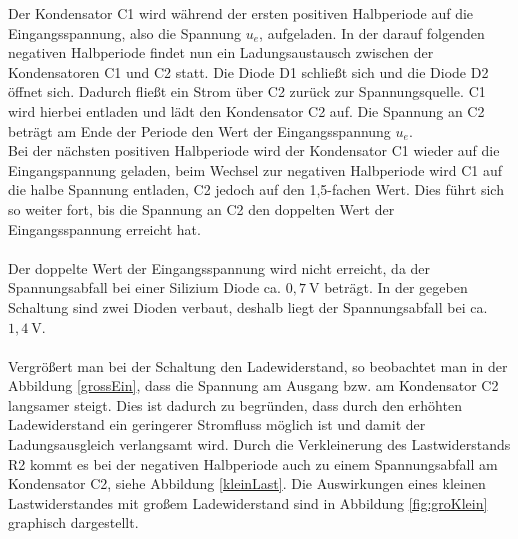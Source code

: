 Der Kondensator C1 wird während der ersten positiven Halbperiode auf die Eingangsspannung, also die Spannung $u_{e}$, aufgeladen. In der darauf folgenden negativen Halbperiode findet nun ein Ladungsaustausch zwischen der Kondensatoren C1 und C2 statt. Die Diode D1 schließt sich und die Diode D2 öffnet sich. Dadurch fließt ein Strom über C2 zurück zur Spannungsquelle. C1 wird hierbei entladen und lädt den Kondensator C2 auf. Die Spannung an C2 beträgt am Ende der Periode den Wert der Eingangsspannung $u_{e}$. \\
Bei der nächsten positiven Halbperiode wird der Kondensator C1 wieder auf die Eingangspannung geladen, beim Wechsel zur negativen Halbperiode wird C1 auf die halbe Spannung entladen, C2 jedoch auf den 1,5-fachen Wert. Dies führt sich so weiter fort, bis die Spannung an C2 den doppelten Wert der Eingangsspannung erreicht hat.
\\ \\
Der doppelte Wert der Eingangsspannung wird nicht erreicht, da der Spannungsabfall bei einer Silizium Diode ca. $0,7\:$\si{\volt} beträgt. In der gegeben Schaltung sind zwei Dioden verbaut, deshalb liegt der Spannungsabfall bei ca. $1,4\:$\si{\volt}. 
\\ \\ 
Vergrößert man bei der Schaltung den Ladewiderstand, so beobachtet man in der Abbildung \ref{grossEin}, dass die Spannung am Ausgang bzw. am Kondensator C2 langsamer steigt. Dies ist dadurch zu begründen, dass durch den erhöhten Ladewiderstand ein geringerer Stromfluss möglich ist und damit der Ladungsausgleich verlangsamt wird. Durch die Verkleinerung des Lastwiderstands R2 kommt es bei der negativen Halbperiode auch zu einem Spannungsabfall am Kondensator C2, siehe Abbildung \ref{kleinLast}. Die Auswirkungen eines kleinen Lastwiderstandes mit großem Ladewiderstand sind in Abbildung \ref{fig:groKlein} graphisch dargestellt.

